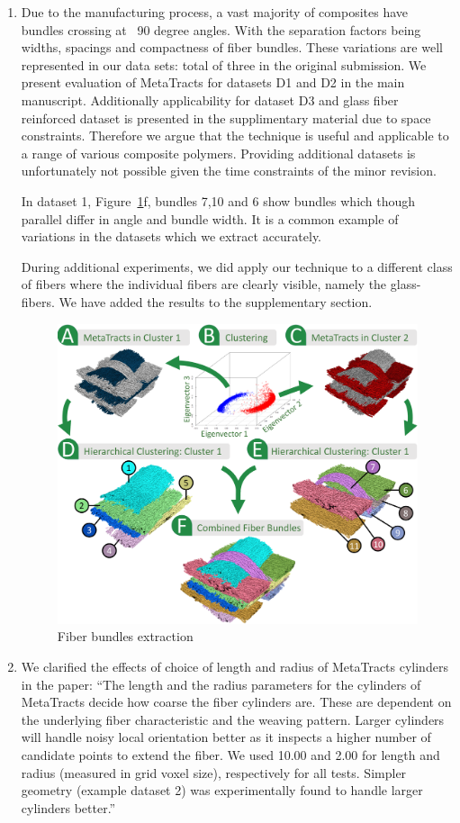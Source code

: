 \documentclass[]{article}
\begin{document}
\begin{enumerate}
	\item {Due to the manufacturing process, a vast majority of composites have bundles crossing at ~90 degree angles. With the separation factors being widths, spacings and compactness of fiber bundles. These variations are well represented in our data sets: total of three in the original submission. We present evaluation of MetaTracts for datasets D1 and D2 in the main manuscript. Additionally applicability for dataset D3 and glass fiber reinforced dataset is presented in the supplimentary material due to space constraints. Therefore we argue that the technique is useful and applicable to a range of various composite polymers. Providing additional datasets is unfortunately not possible given the time constraints of the minor revision. 
		
		In dataset 1, Figure~\ref{fig:angle_bundles}f, bundles 7,10 and 6 show  bundles which  though parallel differ in angle and bundle width. It is a common example of variations in the datasets which we extract accurately. 
		
		During additional experiments, we did apply our technique to a different class of fibers where the individual fibers are clearly visible, namely the glass-fibers. We have added the results to the supplementary section. 
		\begin{figure}
			\centering
			\includegraphics[width=0.7\linewidth]{images_pvis/clustering.pdf}
			\caption{Fiber bundles extraction}
			\label{fig:angle_bundles}
		\end{figure}}
		\item {
			We clarified the effects of choice of length and radius of MetaTracts cylinders in the paper: 
			``The length and the radius parameters for the cylinders of MetaTracts decide how coarse the fiber cylinders are. These are dependent on the underlying fiber characteristic and the weaving pattern. Larger cylinders will handle noisy local orientation better as it inspects a higher number of candidate points to extend the fiber. We used 10.00 and 2.00 for length and radius (measured in grid voxel size), respectively for all tests.  
			Simpler geometry (example dataset 2) was experimentally found to handle larger cylinders better.''
			
}
\end{enumerate}
\end{document}
